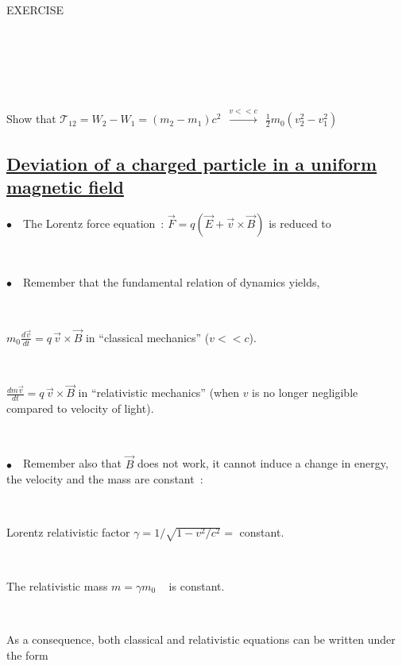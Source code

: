 \documentclass[12pt]{paper}
\newcommand{\B}{\ensuremath{\vec B}}
\newcommand{\nib}{\noindent $\bullet$~}
\newcommand{\vv}{\ensuremath{\vec v}}
\newcommand{\blue}{\color{blue}}
\begin{document}
\clearpage


\begin{center}

EXERCISE  \label{EX4}

\LARGE 
 \blue 

~

~

~

Show that $\mathcal{T}_{12} = W_2 - W_1 = (m_2 -m_1) c^2 ~ ~ \stackrel{v <\!< c}{\longrightarrow} ~ ~ \frac{ \textstyle{1}}{\textstyle{2}} m_0 (v_2^2 - v_1^2) $

\end{center}









\clearpage

\subsection*{\Large \underline{Deviation of a charged particle in a uniform magnetic field} }


\nib\ The Lorentz force equation~: $  \vec F = q (\vec E + \vec v \times \vec B)$ is reduced to 
{\bf \fbox{$  \vec F = q \, \vec v \times \B$} }

~

\nib\ Remember that the fundamental relation of dynamics yields, 

~

$m_0 \frac{ \textstyle{d\vv}}{\textstyle{dt}} = q \, \vec v \times \B$  in ``classical mechanics'' ($v <\! < c$). 

~

$ \frac{ \textstyle{dm\vv}}{\textstyle{dt}} = q \, \vec v \times \B $ in ``relativistic mechanics'' 
(when $v$ is no longer negligible compared to velocity of light).

~

\nib\  Remember also  that  $\B$ does not work, it cannot induce a change in energy,  the 
velocity and the mass are constant~: 

~

Lorentz relativistic factor $\gamma = 1/\sqrt{1 - v^2/c^2} = $ constant. 

~

The relativistic mass  $m = \gamma m_0$  ~ is  constant. 

~

As a consequence, both classical and relativistic equations  can be written under the form 
\end{document}
